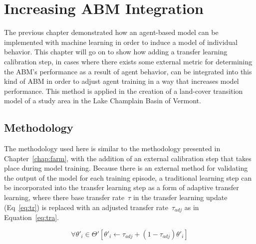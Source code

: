 \chapter{Increasing ABM Integration}
\label{chap:land}

\newcommand{\NSE}[1]{\text{NSE}_{\text{#1}}}


The previous chapter demonstrated how an agent-based model can be
implemented with machine learning in order to induce a model of
individual behavior.
This chapter will go on to show how adding a transfer learning
calibration step, in cases where there exists some external metric
for determining the ABM's performance as a result of agent behavior,
can be integrated into this kind of ABM in order to adjust
agent training in a way that increases model performance.
This method is applied in the creation of a land-cover transition
model of a study area in the Lake Champlain Basin of Vermont.

\section{Methodology}
\label{sec:land_methods}
\label{sec:land_cal}

The methodology used here is similar to the methodology presented in
Chapter~\ref{chap:farm}, with the addition of an external
calibration step that takes place during model training.
Because there is an external method for validating the
output of the model for each training episode,
a traditional learning step can be incorporated into the
transfer learning step as a form of adaptive transfer learning,
where there base transfer rate~$\tau$ in
the transfer learning update (Eq~\ref{eq:tr})
is replaced with an adjusted transfer rate~$\tau_{adj}$
as in Equation~\ref{eq:tra}.

\begin{equation}
\label{eq:tra}
\forall\theta'_i\in\Theta'\left[
\theta'_i\leftarrow\tau_{adj}+(1-\tau_{adj})\theta'_i
\right]
\end{equation}

